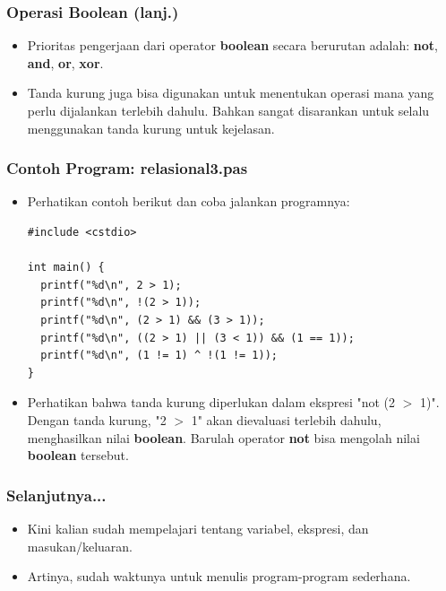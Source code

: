 \begin{frame}
\frametitle{Operasi Boolean (lanj.)}
\begin{itemize}
  \item Prioritas pengerjaan dari operator \textbf{boolean} secara berurutan adalah: \textbf{not}, \textbf{and}, \textbf{or}, \textbf{xor}.
  \item Tanda kurung juga bisa digunakan untuk menentukan operasi mana yang perlu dijalankan terlebih dahulu. Bahkan sangat disarankan untuk selalu menggunakan tanda kurung untuk kejelasan.
\end{itemize}
\end{frame}

\begin{frame}[fragile]
\frametitle{Contoh Program: relasional3.pas}
\begin{itemize}
  \item Perhatikan contoh berikut dan coba jalankan programnya:
\begin{lstlisting}
#include <cstdio>

int main() {
  printf("%d\n", 2 > 1);
  printf("%d\n", !(2 > 1));
  printf("%d\n", (2 > 1) && (3 > 1));
  printf("%d\n", ((2 > 1) || (3 < 1)) && (1 == 1));
  printf("%d\n", (1 != 1) ^ !(1 != 1));
}\end{lstlisting}
  \item Perhatikan bahwa tanda kurung diperlukan dalam ekspresi "not (2 $>$ 1)". Dengan tanda kurung, "2 $>$ 1" akan dievaluasi terlebih dahulu, menghasilkan nilai \textbf{boolean}. Barulah operator \textbf{not} bisa mengolah nilai \textbf{boolean} tersebut.
\end{itemize}
\end{frame}

\begin{frame}
\frametitle{Selanjutnya...}
\begin{itemize}
  \item Kini kalian sudah mempelajari tentang variabel, ekspresi, dan masukan/keluaran.
  \item Artinya, sudah waktunya untuk menulis program-program sederhana.
\end{itemize}
\end{frame}


